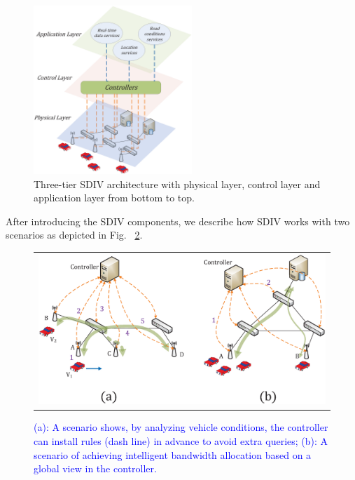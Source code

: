 \documentclass[journal]{IEEEtran}
\begin{document}
\begin{figure} [t]
\begin{center}
\includegraphics[width=0.9\columnwidth,height=2.5in]{fig-2-24.eps}
\vspace{-0.2in}
\caption{Three-tier SDIV architecture with physical layer, control layer and application layer from bottom to top.} \label{fig2}
\end{center}
\vspace{-0.3in}
\end{figure}

After introducing the SDIV components, we describe how SDIV works with two scenarios as depicted in Fig. ~\ref{fig3}.


\begin{figure} [t]
\begin{center}
\begin{tabular}{c}
\includegraphics[width=1\columnwidth]{fig-3-29.eps} \\
\end{tabular}
\caption{\textcolor{blue}{(a): A scenario shows, by analyzing vehicle conditions, the controller can install rules (dash line) in advance to avoid extra queries; (b): A scenario of achieving intelligent bandwidth allocation based on a global view in the controller.}} \label{fig3}
  \end{center}
  \vspace{-0.3in}
\end{figure}
\end{document}
